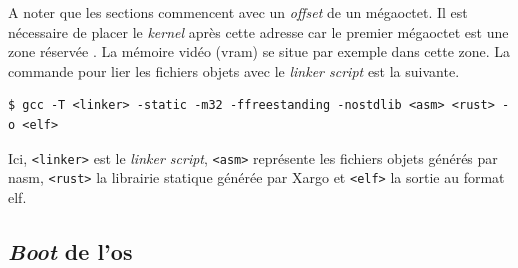 \begin{center}
    \label{tab:exec:linker_sections}
\end{center}

A noter que les sections commencent avec un \textit{offset} de un mégaoctet. Il
est nécessaire de placer le \textit{kernel} après cette adresse car le premier
mégaoctet est une zone réservée \cite{ref42,ref13}. La mémoire vidéo (\acrshort{vram})
se situe par exemple dans cette zone. La commande pour lier les fichiers objets
avec le \textit{linker script} est la suivante.

\begin{verbatim}
$ gcc -T <linker> -static -m32 -ffreestanding -nostdlib <asm> <rust> -o <elf>
\end{verbatim}

Ici, \texttt{<linker>} est le \textit{linker script}, \texttt{<asm>}
représente les fichiers objets générés par \acrshort{nasm}, \texttt{<rust>}
la librairie statique générée par Xargo et \texttt{<elf>} la sortie au
format \acrshort{elf}. \\


\subsection{\textit{Boot} de l'\acrshort{os}}

